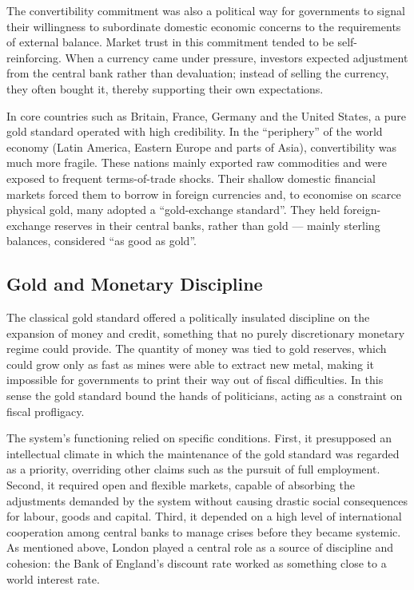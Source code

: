 The convertibility commitment was also a political way for governments to signal their willingness to subordinate domestic economic concerns to the requirements of external balance. Market trust in this commitment tended to be self-reinforcing. When a currency came under pressure, investors expected adjustment from the central bank rather than devaluation; instead of selling the currency, they often bought it, thereby supporting their own expectations.
 
In core countries such as Britain, France, Germany and the United States, a pure gold standard operated with high credibility. In the ``periphery'' of the world economy (Latin America, Eastern Europe and parts of Asia), convertibility was much more fragile. These nations mainly exported raw commodities and were exposed to frequent terms-of-trade shocks. Their shallow domestic financial markets forced them to borrow in foreign currencies and, to economise on scarce physical gold, many adopted a ``gold-exchange standard''. They held foreign-exchange reserves in their central banks, rather than gold --- mainly sterling balances, considered ``as good as gold''.
\subsection{Gold and Monetary Discipline}
The classical gold standard offered a politically insulated discipline on the expansion of money and credit, something that no purely discretionary monetary regime could provide. The quantity of money was tied to gold reserves, which could grow only as fast as mines were able to extract new metal, making it impossible for governments to print their way out of fiscal difficulties. In this sense the gold standard bound the hands of politicians, acting as a constraint on fiscal profligacy.
 
The system's functioning relied on specific conditions. First, it presupposed an intellectual climate in which the maintenance of the gold standard was regarded as a priority, overriding other claims such as the pursuit of full employment. Second, it required open and flexible markets, capable of absorbing the adjustments demanded by the system without causing drastic social consequences for labour, goods and capital. Third, it depended on a high level of international cooperation among central banks to manage crises before they became systemic. As mentioned above, London played a central role as a source of discipline and cohesion: the Bank of England's discount rate worked as something close to a world interest rate.
 
